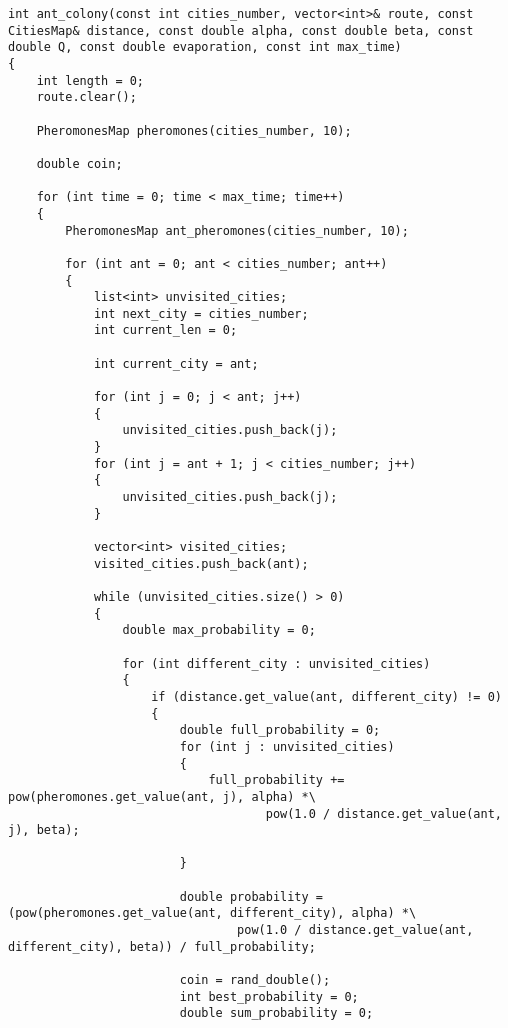 \documentclass[a4paper, 14pt]{article}
\begin{document}
\begin{lstlisting}[label=aco,caption=Муравьиный алгоритм]
int ant_colony(const int cities_number, vector<int>& route, const CitiesMap& distance, const double alpha, const double beta, const double Q, const double evaporation, const int max_time)
{
    int length = 0;
    route.clear();
    
    PheromonesMap pheromones(cities_number, 10);
    
    double coin;

    for (int time = 0; time < max_time; time++)
    {
        PheromonesMap ant_pheromones(cities_number, 10);
        
        for (int ant = 0; ant < cities_number; ant++)
        {
            list<int> unvisited_cities;
            int next_city = cities_number;
            int current_len = 0;
            
            int current_city = ant;
    
            for (int j = 0; j < ant; j++)
            {
                unvisited_cities.push_back(j);
            }
            for (int j = ant + 1; j < cities_number; j++)
            {
                unvisited_cities.push_back(j);
            }
            
            vector<int> visited_cities;
            visited_cities.push_back(ant);
            
            while (unvisited_cities.size() > 0)
            {
                double max_probability = 0;

                for (int different_city : unvisited_cities)
                {
                    if (distance.get_value(ant, different_city) != 0)
                    {
                        double full_probability = 0;
                        for (int j : unvisited_cities)
                        {
                            full_probability += pow(pheromones.get_value(ant, j), alpha) *\
                                    pow(1.0 / distance.get_value(ant, j), beta);
                            
                        }
                        
                        double probability = (pow(pheromones.get_value(ant, different_city), alpha) *\
                                pow(1.0 / distance.get_value(ant, different_city), beta)) / full_probability;
                        
                        coin = rand_double();
                        int best_probability = 0;
                        double sum_probability = 0;
                        

\end{lstlisting}
\end{document}

